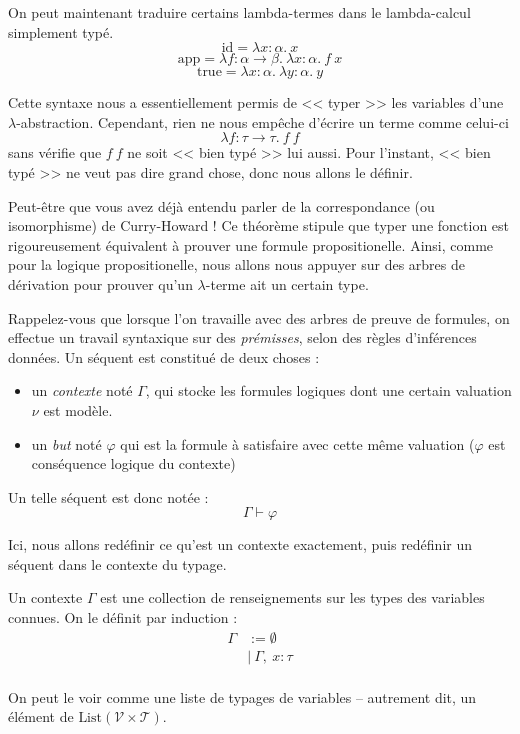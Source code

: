 \documentclass[11pt]{article}
\begin{document}
\begin{example}
    On peut maintenant traduire certains lambda-termes dans le lambda-calcul simplement typé.
    $$\text{id}=\lambda x: \alpha.~x$$
    $$\text{app}=\lambda f:\alpha\to\beta.~\lambda x:\alpha.~f~x$$
    $$\text{true}=\lambda x: \alpha.~\lambda y:\alpha.~y$$
\end{example}

Cette syntaxe nous a essentiellement permis de << typer >> les variables d'une $\lambda$-abstraction. Cependant, rien ne nous empêche d'écrire un terme comme celui-ci
$$\lambda f:\tau\to\tau.~f~f$$
sans vérifie que $f~f$ ne soit << bien typé >> lui aussi. Pour l'instant, << bien typé >> ne veut pas dire grand chose, donc nous allons le définir.

Peut-être que vous avez déjà entendu parler de la correspondance (ou isomorphisme) de Curry-Howard ! Ce théorème stipule que typer une fonction est rigoureusement équivalent à prouver une formule propositionelle. Ainsi, comme pour la logique propositionelle, nous allons nous appuyer sur des arbres de dérivation pour prouver qu'un $\lambda$-terme ait un certain type.

Rappelez-vous que lorsque l'on travaille avec des arbres de preuve de formules, on effectue un travail syntaxique sur des \textit{prémisses}, selon des règles d'inférences données. Un séquent est constitué de deux choses :
\begin{itemize}
    \item un \textit{contexte} noté $\Gamma$, qui stocke les formules logiques dont une certain valuation $\nu$ est modèle.
    \item un \textit{but} noté $\varphi$ qui est la formule à satisfaire avec cette même valuation ($\varphi$ est conséquence logique du contexte)
\end{itemize}
Un telle séquent est donc notée :
$$\Gamma \vdash \varphi$$

Ici, nous allons redéfinir ce qu'est un contexte exactement, puis redéfinir un séquent dans le contexte du typage.

\begin{definition}
    Un contexte $\Gamma$ est une collection de renseignements sur les types des variables connues. On le définit par induction :
    \begin{equation*}
    \begin{aligned}
        \Gamma &:=\emptyset\\
        &|~\Gamma,~x:\tau\\
    \end{aligned}
    \end{equation*}

    On peut le voir comme une liste de typages de variables -- autrement dit, un élément de $\text{List}(\mathcal{V}\times\mathcal{T})$.
\end{definition}
\end{document}
